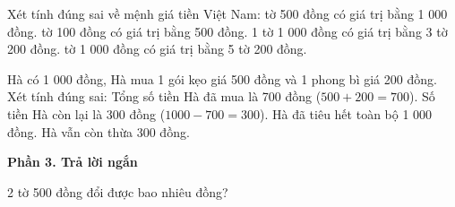 \begin{ex} %
Xét tính đúng sai về mệnh giá tiền Việt Nam:
\choiceTF
{ tờ 500 đồng có giá trị bằng 1 000 đồng.}
{ tờ 100 đồng có giá trị bằng 500 đồng.}
{1 tờ 1 000 đồng có giá trị bằng 3 tờ 200 đồng.}
{ tờ 1 000 đồng có giá trị bằng 5 tờ 200 đồng.}
\end{ex}

\begin{ex} %
Hà có 1 000 đồng, Hà mua 1 gói kẹo giá 500 đồng và 1 phong bì giá 200 đồng. Xét tính đúng sai:
\choiceTF
{\True Tổng số tiền Hà đã mua là 700 đồng ($500 + 200 = 700$).}
{\True Số tiền Hà còn lại là 300 đồng ($1000 - 700 = 300$).}
{Hà đã tiêu hết toàn bộ 1 000 đồng.}
{\True Hà vẫn còn thừa 300 đồng.}
\end{ex}

\textbf{Phần 3. Trả lời ngắn}

\begin{ex} %
2 tờ 500 đồng đổi được bao nhiêu đồng?
\end{ex}

